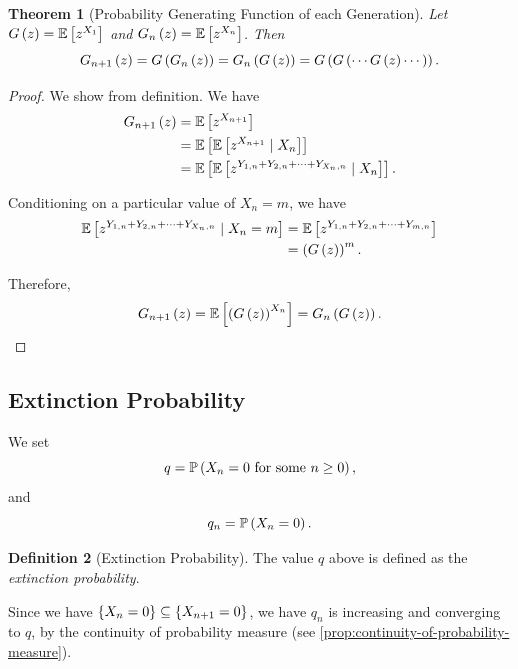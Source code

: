 \documentclass{article}
\newtheorem{theorem}{Theorem}[section]
\theoremstyle{definition}
\newtheorem{definition}[theorem]{Definition}
\theoremstyle{remark}
\newcommand{\Prob}{\mathbb{P}}
\newcommand{\Expt}{\mathbb{E}}
\newcommand{\Conditional}[2]{#1\mid #2}
\begin{document}
\begin{theorem}[Probability Generating Function of each Generation]
    \label{thm:branching-processes-pgf}%
    Let \(G\pqty{z} = \Expt\bqty{z^{X_1}}\) and \(G_n\pqty{z} = \Expt\bqty{z^{X_n}}\). Then
    \[
        G_{n + 1} \left(z\right) = G\left(G_{n} \left(z\right)\right) = G_n\left(G\left(z\right)\right) = G\left(G\left(\cdots G\left(z\right) \cdots\right)\right).
    \]  
\end{theorem}

\begin{proof}
    We show from definition. We have
    \begin{align*}
        G_{n + 1} \pqty{z} &= \Expt\bqty{z^{X_{n + 1}}} \\
        &= \Expt\bqty{\Expt\bqty{\Conditional{z^{X_{n + 1}}}{X_n}}} \\
        &= \Expt\bqty{\Expt\bqty{\Conditional{z^{Y_{1, n} + Y_{2, n} + \cdots + Y_{X_n, n}}}{X_n}}}.
    \end{align*}

    Conditioning on a particular value of \(X_n = m\), we have
    \begin{align*}
        \Expt\bqty{\Conditional{z^{Y_{1, n} + Y_{2, n} + \cdots + Y_{X_n, n}}}{X_n = m}} &= \Expt\bqty{z^{Y_{1, n} + Y_{2, n} + \cdots + Y_{m, n}}} \\
        &= \pqty{G\pqty{z}}^{m}.
    \end{align*}

    Therefore,
    \[
        G_{n + 1} \pqty{z} = \Expt\bqty{\pqty{G\pqty{z}}^{X_n}} = G_n \pqty{G\pqty{z}}.
    \]
\end{proof}

\subsection{Extinction Probability}

We set
\[
    q = \Prob\pqty{X_n = 0 \text{ for some } n \geq 0},
\]
and
\[
    q_n = \Prob\pqty{X_n = 0}.
\]

\begin{definition}[Extinction Probability]
    \label{def:exctinction-probability}%
    The value \(q\) above is defined as the \emph{extinction probability}.
\end{definition}

Since we have \(\left\{X_n = 0\right\} \subseteq \left\{X_{n + 1} = 0\right\}\), we have \(q_n\) is increasing and converging to \(q\), by the continuity of probability measure (see \autoref{prop:continuity-of-probability-measure}).
\end{document}

